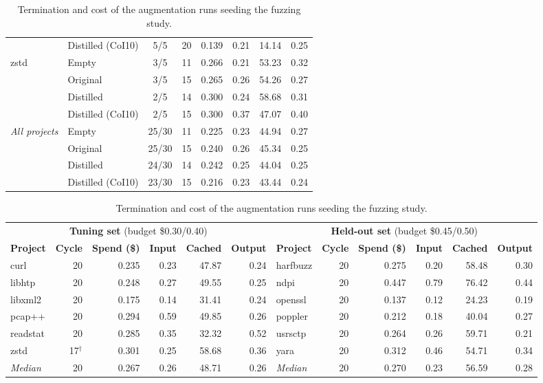 \begin{table}[!b]
\begin{tabular}{llccrrrr}
       & Distilled (CoI10) & 5/5 & 20 & 0.139 & 0.21 & 14.14 & 0.25 \\
      \multirow{4}{*}{zstd} & Empty & 3/5 & 11 & 0.266 & 0.21 & 53.23 & 0.32 \\
       & Original & 3/5 & 15 & 0.265 & 0.26 & 54.26 & 0.27 \\
       & Distilled & 2/5 & 14 & 0.300 & 0.24 & 58.68 & 0.31 \\
       & Distilled (CoI10) & 2/5 & 15 & 0.300 & 0.37 & 47.07 & 0.40 \\
      \midrule
      \multirow{4}{*}{\textit{All projects}} & Empty & 25/30 & 11 & 0.225 & 0.23 & 44.94 & 0.27 \\
       & Original & 25/30 & 15 & 0.240 & 0.26 & 45.34 & 0.25 \\
       & Distilled & 24/30 & 14 & 0.242 & 0.25 & 44.04 & 0.25 \\
       & Distilled (CoI10) & 23/30 & 15 & 0.216 & 0.23 & 43.44 & 0.24 \\
    \bottomrule
  \end{tabular}
  \caption{Termination and cost of the configuration study augmentation runs.}\label{tab:termination-campaigns}
  \vspace{0.8em}
  \begin{tabular}{lrrrrr@{\hspace{1.5em}}lrrrrr}
    \toprule
      \multicolumn{6}{c}{\textbf{Tuning set} (budget \$0.30/0.40)} & \multicolumn{6}{c}{\textbf{Held-out set} (budget \$0.45/0.50)} \\
      \cmidrule(lr){1-6} \cmidrule(lr){7-12}
      \textbf{Project} & \textbf{Cycle} & \textbf{Spend (\$)} & \textbf{Input} & \textbf{Cached} & \textbf{Output} & \textbf{Project} & \textbf{Cycle} & \textbf{Spend (\$)} & \textbf{Input} & \textbf{Cached} & \textbf{Output} \\
    \midrule
      curl & 20 & 0.235 & 0.23 & 47.87 & 0.24 & harfbuzz & 20 & 0.275 & 0.20 & 58.48 & 0.30 \\
      libhtp & 20 & 0.248 & 0.27 & 49.55 & 0.25 & ndpi & 20 & 0.447 & 0.79 & 76.42 & 0.44 \\
      libxml2 & 20 & 0.175 & 0.14 & 31.41 & 0.24 & openssl & 20 & 0.137 & 0.12 & 24.23 & 0.19 \\
      pcap++ & 20 & 0.294 & 0.59 & 49.85 & 0.26 & poppler & 20 & 0.212 & 0.18 & 40.04 & 0.27 \\
      readstat & 20 & 0.285 & 0.35 & 32.32 & 0.52 & usrsctp & 20 & 0.264 & 0.26 & 59.71 & 0.21 \\
      zstd & 17$^\dagger$ & 0.301 & 0.25 & 58.68 & 0.36 & yara & 20 & 0.312 & 0.46 & 54.71 & 0.34 \\
      \midrule
      \textit{Median} & 20 & 0.267 & 0.26 & 48.71 & 0.26 & \textit{Median} & 20 & 0.270 & 0.23 & 56.59 & 0.28 \\
    \bottomrule
  \end{tabular}
  \caption{Termination and cost of the augmentation runs seeding the fuzzing study.}\label{tab:termination-fuzzing}
\end{table}
